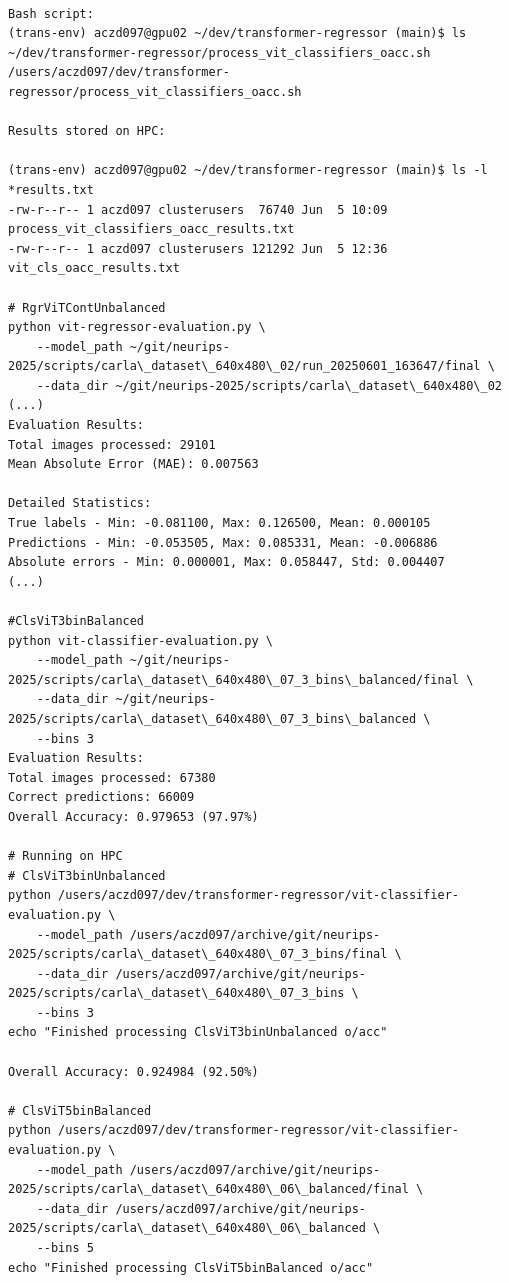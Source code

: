 \begin{verbatim}

Bash script:
(trans-env) aczd097@gpu02 ~/dev/transformer-regressor (main)$ ls ~/dev/transformer-regressor/process_vit_classifiers_oacc.sh
/users/aczd097/dev/transformer-regressor/process_vit_classifiers_oacc.sh

Results stored on HPC:

(trans-env) aczd097@gpu02 ~/dev/transformer-regressor (main)$ ls -l *results.txt
-rw-r--r-- 1 aczd097 clusterusers  76740 Jun  5 10:09 process_vit_classifiers_oacc_results.txt
-rw-r--r-- 1 aczd097 clusterusers 121292 Jun  5 12:36 vit_cls_oacc_results.txt

# RgrViTContUnbalanced
python vit-regressor-evaluation.py \
    --model_path ~/git/neurips-2025/scripts/carla\_dataset\_640x480\_02/run_20250601_163647/final \
    --data_dir ~/git/neurips-2025/scripts/carla\_dataset\_640x480\_02
(...)
Evaluation Results:
Total images processed: 29101
Mean Absolute Error (MAE): 0.007563

Detailed Statistics:
True labels - Min: -0.081100, Max: 0.126500, Mean: 0.000105
Predictions - Min: -0.053505, Max: 0.085331, Mean: -0.006886
Absolute errors - Min: 0.000001, Max: 0.058447, Std: 0.004407
(...)

#ClsViT3binBalanced
python vit-classifier-evaluation.py \
    --model_path ~/git/neurips-2025/scripts/carla\_dataset\_640x480\_07_3_bins\_balanced/final \
    --data_dir ~/git/neurips-2025/scripts/carla\_dataset\_640x480\_07_3_bins\_balanced \
    --bins 3
Evaluation Results:
Total images processed: 67380
Correct predictions: 66009
Overall Accuracy: 0.979653 (97.97%)

# Running on HPC
# ClsViT3binUnbalanced
python /users/aczd097/dev/transformer-regressor/vit-classifier-evaluation.py \
    --model_path /users/aczd097/archive/git/neurips-2025/scripts/carla\_dataset\_640x480\_07_3_bins/final \
    --data_dir /users/aczd097/archive/git/neurips-2025/scripts/carla\_dataset\_640x480\_07_3_bins \
    --bins 3
echo "Finished processing ClsViT3binUnbalanced o/acc"

Overall Accuracy: 0.924984 (92.50%)

# ClsViT5binBalanced
python /users/aczd097/dev/transformer-regressor/vit-classifier-evaluation.py \
    --model_path /users/aczd097/archive/git/neurips-2025/scripts/carla\_dataset\_640x480\_06\_balanced/final \
    --data_dir /users/aczd097/archive/git/neurips-2025/scripts/carla\_dataset\_640x480\_06\_balanced \
    --bins 5
echo "Finished processing ClsViT5binBalanced o/acc"


\end{verbatim}
